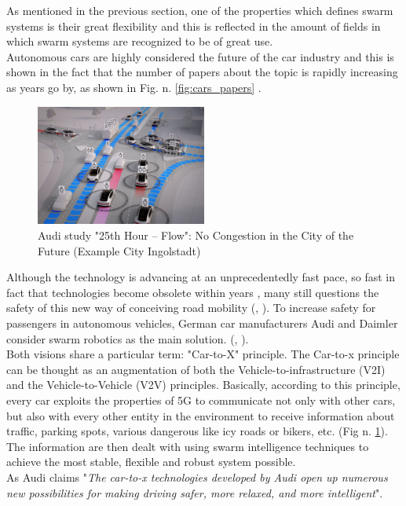 \documentclass[conference]{IEEEtran}
\begin{document}
As mentioned in the previous section, one of the properties which defines swarm systems is their great flexibility and this is reflected in the amount of fields in which swarm systems are recognized to be of great use. \\
Autonomous cars are highly considered the future of the car industry and this is shown in the fact that the number of papers about the topic is rapidly increasing as years go by, as shown in Fig. n. \ref{fig:cars_papers} \cite{unknown}.\\
\begin{figure}[htb]
    \centering
    \includegraphics[width=0.5\textwidth]{img/future_city.jpg}
    \caption{Audi study "25th Hour – Flow": No Congestion in the City of the Future (Example City Ingolstadt) \cite{AUDI_CAR}}
    \label{fig:future_city}
\end{figure}
Although the technology is advancing at an unprecedentedly fast pace, so fast in fact that technologies become obsolete within years \cite{unknown}, many still questions the safety of this new way of conceiving road mobility (\cite{Johnson+2020+137+155}, \cite{robert_are_2019}). To increase safety for passengers in autonomous vehicles, German car manufacturers Audi and Daimler consider swarm robotics as the main solution. (\cite{AUDI_CAR}, \cite{daimler}).\\
Both visions share a particular term: "Car-to-X" principle. The Car-to-x principle can be thought as an augmentation of both the Vehicle-to-infrastructure (V2I) and the Vehicle-to-Vehicle (V2V) principles. Basically, according to this principle, every car exploits the properties of 5G to communicate not only with other cars, but also with every other entity in the environment to receive information about traffic, parking spots, various dangerous like icy roads or bikers, etc. (Fig n. \ref{fig:future_city}). 
The information are then dealt with using swarm intelligence techniques to achieve the most stable, flexible and robust system possible. \\
As Audi claims "\textit{The car-to-x technologies developed by Audi open up numerous new possibilities for making driving safer, more relaxed, and more intelligent}"\cite{AUDI_CAR}. \\
\end{document}
